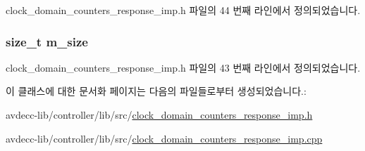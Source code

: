 clock\+\_\+domain\+\_\+counters\+\_\+response\+\_\+imp.\+h 파일의 44 번째 라인에서 정의되었습니다.

\subsubsection[{\texorpdfstring{m\+\_\+size}{m_size}}]{\setlength{\rightskip}{0pt plus 5cm}size\+\_\+t m\+\_\+size\hspace{0.3cm}{\ttfamily [private]}}\hypertarget{classavdecc__lib_1_1clock__domain__counters__response__imp_a0dc3c363255f193681c77b4d2a82e995}{}\label{classavdecc__lib_1_1clock__domain__counters__response__imp_a0dc3c363255f193681c77b4d2a82e995}


clock\+\_\+domain\+\_\+counters\+\_\+response\+\_\+imp.\+h 파일의 43 번째 라인에서 정의되었습니다.



이 클래스에 대한 문서화 페이지는 다음의 파일들로부터 생성되었습니다.\+:\begin{DoxyCompactItemize}
\item 
avdecc-\/lib/controller/lib/src/\hyperlink{clock__domain__counters__response__imp_8h}{clock\+\_\+domain\+\_\+counters\+\_\+response\+\_\+imp.\+h}\item 
avdecc-\/lib/controller/lib/src/\hyperlink{clock__domain__counters__response__imp_8cpp}{clock\+\_\+domain\+\_\+counters\+\_\+response\+\_\+imp.\+cpp}\end{DoxyCompactItemize}
